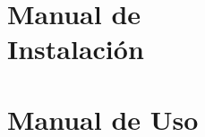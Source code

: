 \documentclass[12pt, a4paper, twoside]{article}
\begin{document}















\begin{umaappendices}
    \section{Manual de \\ Instalación}
    \section{Manual de Uso}
\end{umaappendices}



\end{document}
